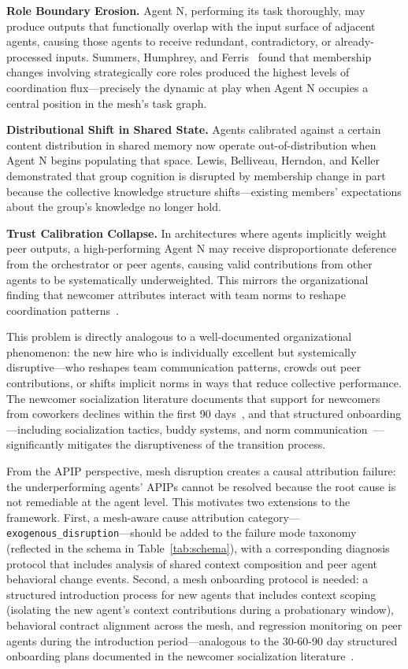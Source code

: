 \textbf{Role Boundary Erosion.} Agent N, performing its task thoroughly, may
produce outputs that functionally overlap with the input surface of adjacent
agents, causing those agents to receive redundant, contradictory, or
already-processed inputs. Summers, Humphrey, and Ferris~\cite{summers2012team}
found that membership changes involving strategically core roles produced the
highest levels of coordination flux---precisely the dynamic at play when Agent
N occupies a central position in the mesh's task graph.

\textbf{Distributional Shift in Shared State.} Agents calibrated against a
certain content distribution in shared memory now operate out-of-distribution
when Agent N begins populating that space. Lewis, Belliveau, Herndon, and
Keller~\cite{lewis2007group} demonstrated that group cognition is disrupted by
membership change in part because the collective knowledge structure
shifts---existing members' expectations about the group's knowledge no longer
hold.

\textbf{Trust Calibration Collapse.} In architectures where agents implicitly
weight peer outputs, a high-performing Agent N may receive disproportionate
deference from the orchestrator or peer agents, causing valid contributions
from other agents to be systematically underweighted. This mirrors the
organizational finding that newcomer attributes interact with team norms to
reshape coordination patterns~\cite{trainer2020membership}.

This problem is directly analogous to a well-documented organizational
phenomenon: the new hire who is individually excellent but systemically
disruptive---who reshapes team communication patterns, crowds out peer
contributions, or shifts implicit norms in ways that reduce collective
performance. The newcomer socialization literature documents that support for
newcomers from coworkers declines within the first 90
days~\cite{kammeyer2013support}, and that structured onboarding---including
socialization tactics, buddy systems, and norm
communication~\cite{bauer2025newcomer,trainer2020membership}---significantly
mitigates the disruptiveness of the transition process.

From the APIP perspective, mesh disruption creates a causal attribution
failure: the underperforming agents' APIPs cannot be resolved because the root
cause is not remediable at the agent level. This motivates two extensions to
the framework. First, a mesh-aware cause attribution
category---\texttt{exogenous\_disruption}---should be added to the failure mode
taxonomy (reflected in the schema in Table~\ref{tab:schema}), with a
corresponding diagnosis protocol that includes analysis of shared context
composition and peer agent behavioral change events. Second, a mesh onboarding
protocol is needed: a structured introduction process for new agents that
includes context scoping (isolating the new agent's context contributions
during a probationary window), behavioral contract alignment across the mesh,
and regression monitoring on peer agents during the introduction
period---analogous to the 30-60-90 day structured onboarding plans documented
in the newcomer socialization literature~\cite{bauer2025newcomer,kammeyer2013support}.


